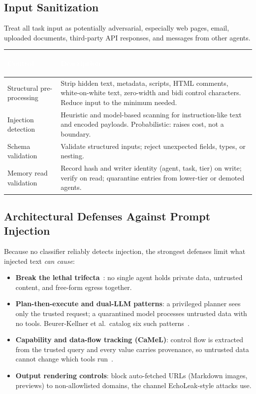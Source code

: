 \documentclass[11pt,letterpaper]{article}
\newcommand{\hrow}{\rowcolor{slategraphite}}
\newcommand{\hdr}[1]{\textcolor{white}{\bfseries\strut #1}}
\begin{document}
\subsection{Input Sanitization}
\label{sec:inputs}

Treat all task input as potentially adversarial, especially web pages, email, uploaded documents, third-party API responses, and messages from other agents.

\begin{longtable}{L{3.6cm} L{12.4cm}}
\hrow \hdr{Control} & \hdr{Description} \\
\endhead
Structural pre-processing & Strip hidden text, metadata, scripts, HTML comments, white-on-white text, zero-width and bidi control characters. Reduce input to the minimum needed. \\
Injection detection & Heuristic and model-based scanning for instruction-like text and encoded payloads. Probabilistic: raises cost, not a boundary. \\
Schema validation & Validate structured inputs; reject unexpected fields, types, or nesting. \\
Memory read validation & Record hash and writer identity (agent, task, tier) on write; verify on read; quarantine entries from lower-tier or demoted agents. \\*
\bottomrule
\end{longtable}

\subsection{Architectural Defenses Against Prompt Injection}
\label{sec:archdef}

Because no classifier reliably detects injection, the strongest defenses limit what injected text \emph{can cause}:

\begin{itemize}
  \item \textbf{Break the lethal trifecta}~\cite{trifecta}: no single agent holds private data, untrusted content, and free-form egress together.
  \item \textbf{Plan-then-execute and dual-LLM patterns}: a privileged planner sees only the trusted request; a quarantined model processes untrusted data with no tools. Beurer-Kellner et al.\ catalog six such patterns~\cite{patterns}.
  \item \textbf{Capability and data-flow tracking (CaMeL)}: control flow is extracted from the trusted query and every value carries provenance, so untrusted data cannot change which tools run~\cite{camel}.
  \item \textbf{Output rendering controls}: block auto-fetched URLs (Markdown images, previews) to non-allowlisted domains, the channel EchoLeak-style attacks use.
\end{itemize}
\end{document}
